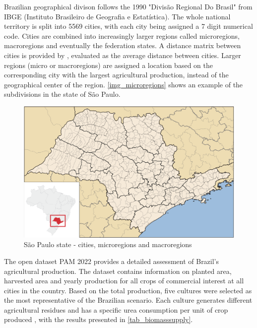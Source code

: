 \documentclass[a4paper, titlepage]{article}
\begin{document}
Brazilian geographical divison follows the 1990 "Divisão Regional Do Brasil" from IBGE (Instituto Brasileiro de
Geografia e Estatística). The whole national territory is split into 5569 cities, with each city being assigned a 7 digit
numerical code. Cities are combined into increasingly larger regions called 
microregions, macroregions and eventually the federation states. A distance matrix between cities is provided by
\textcite{carvalhoMatrizesDistanciasTempo2021}, evaluated as the average distance between cities. Larger regions
(micro or macroregions) are assigned a location based on the corresponding city with the largest agricultural production,
instead of the geographical center of the region. \autoref{img_microregions} shows an example of the subdivisions in
the state of São Paulo.

\begin{figure}
	\includegraphics[width=\textwidth]{img/saopaulo_microregions.png}
	\caption{São Paulo state - cities, microregions and macroregions}
	\label{img_microregions}
\end{figure}

The open dataset PAM 2022 \cite{IBGEPAMProducao} provides a detailed assessment of Brazil's agricultural production.
The dataset contains information on planted area, harvested area and yearly production for all crops of commercial
interest at all cities in the country. Based on the total production, five cultures were selected as the most
representative of the Brazilian scenario. Each culture generates different agricultural residues
 \cite{souzaTheoreticalTechnicalAssessment2021} and has a specific urea consumption per unit of crop produced 
 \cite{IFASTATFertilizerUse}, with the results presented in \autoref{tab_biomasssupply}. 
\end{document}
